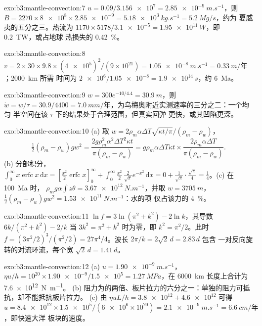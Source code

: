 \begin{solution}{exo:b3:mantle-convection:7}
$u = 0.09/\num{3.156e7} = \qty{2.85e-9}{m.s^{-1}}$，则 $B = 2270\times\num{8e8}
\times\num{2.85e-9} = \qty{5.18e3}{kg.s^{-1}} = \qty{5.2}{Mg/s}$，约为
夏威夷的五分之三。热流为 $1170\times5178/\num{3.1e-5} =
\qty{1.95e11}{W}$，即 \qty{0.2}{TW}，或占地球
热损失的 \qty{0.42}{\percent}。
\end{solution}

\begin{solution}{exo:b3:mantle-convection:8}
$v = 2\times30\times9.8\times(\num{4e5})^2/(9\times10^{21}) =
\qty{1.05e-8}{m.s^{-1}} = \qty{0.33}{m/\text{年}}$；\qty{2000}{km} 所需
时间为 $\num{2e6}/\num{1.05e-8} = \qty{1.9e14}{s}$，约 \qty{6}{Ma}。
\end{solution}

\begin{solution}{exo:b3:mantle-convection:9}
$w = 300e^{-10/4.4} = \qty{30.9}{m}$，则 $\dot w = w/\tau = 30.9/4400 =
\qty{7.0}{mm/\text{年}}$，为乌梅奥附近实测速率的三分之二：一个均匀
半空间在该 $\tau$ 下的结果处于合理范围，但真实回弹
更快，或其凹陷更深。
\end{solution}

\begin{solution}{exo:b3:mantle-convection:10}
(a) 取 $w = 2\rho_m\alpha\Delta T\sqrt{\kappa t/\pi}/(\rho_m - \rho_w)$，
\[
  \tfrac12(\rho_m - \rho_w)gw^2 = \frac{2g\rho_m^2\alpha^2\Delta T^2\kappa t}
  {\pi(\rho_m - \rho_w)} = g\rho_m\alpha\Delta T\kappa t\times
  \frac{2\rho_m\alpha\Delta T}{\pi(\rho_m - \rho_w)} .
\] (b) 分部积分，
$\int_0^\infty x\operatorname{erfc}x\,\mathrm dx = [\tfrac{x^2}2\operatorname{erfc}
x]_0^\infty + \int_0^\infty\tfrac{x^2}2\,\tfrac2{\sqrt\pi}e^{-x^2}\,\mathrm dx =
0 + \tfrac1{\sqrt\pi}\cdot\tfrac{\sqrt\pi}4 = \tfrac14$。(c) 在 \qty{100}{Ma} 时，
$\rho_mg\alpha\int z\theta = \qty{3.67e12}{N.m^{-1}}$，并取 $w =
\qty{3705}{m}$，$\tfrac12(\rho_m - \rho_w)gw^2 = \qty{1.53e11}{N.m^{-1}}$：水的项
仅占该力的 \qty{4}{\percent}。
\end{solution}

\begin{solution}{exo:b3:mantle-convection:11}
$\ln f = 3\ln(\pi^2 + k^2) - 2\ln k$，其导数 $6k/(\pi^2 + k^2) - 2/k$
当 $3k^2 = \pi^2 + k^2$ 时为零，即 $k^2 = \pi^2/2$。此时 $f = (3\pi^2/2)^3/
(\pi^2/2) = 27\pi^4/4$。波长 $2\pi/k = 2\sqrt2\,d = 2.83\,d$ 包含
一对反向旋转的对流环流，每个宽 $\sqrt2\,d = 1.41\,d$。
\end{solution}

\begin{solution}{exo:b3:mantle-convection:12}
(a) $u = \qty{1.90e-9}{m.s^{-1}}$，$\eta u/h = 10^{20}\times\num{1.90e-9}/
\num{1.5e5} = \qty{1.27}{MPa}$，在 \qty{6000}{km} 长度上合计为 \qty{7.6e12}{N.m^{-1}}。
(b) 阻力为的两倍、板片拉力的六分之一：单独的阻力可抵抗，却不能抵抗板片拉力。
(c) 由 $\eta uL/h = \num{3.8e12} +
\num{4.6e12}$ 可得 $u = \num{8.4e12}\times\num{1.5e5}/(\num{6e6}\times10^{20})
= \qty{2.1e-9}{m.s^{-1}} = \qty{6.6}{cm/\text{年}}$，即快速大洋
板块的速度。
\end{solution}

